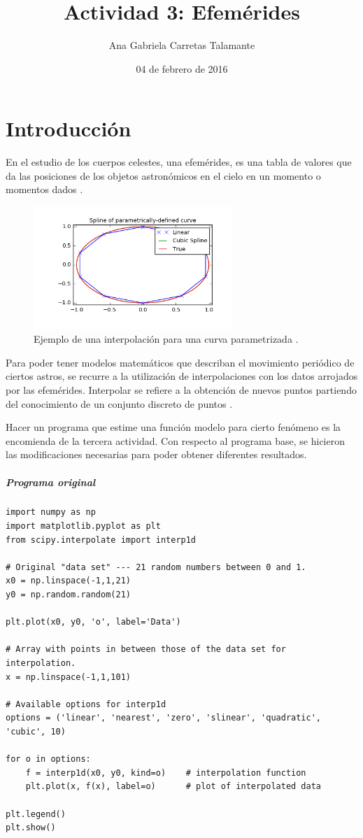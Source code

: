 \documentclass[12pt]{article}
\title{Actividad 3: Efemérides}
\author{Ana Gabriela Carretas Talamante}
\date{04 de febrero de 2016}
\begin{document}
\maketitle
\section{Introducción}
En el estudio de los cuerpos celestes, una efemérides, es una tabla de valores que da las posiciones de los objetos astronómicos en el cielo en un momento o momentos dados \cite{W}. 

\begin{figure}[H]
\centering
\includegraphics[width=7.5cm]{2}
\caption{Ejemplo de una interpolación para una curva parametrizada \cite{E}.}
\end{figure}

Para poder tener modelos matemáticos que describan el movimiento periódico de ciertos astros, se recurre a la utilización de interpolaciones con los datos arrojados por las efemérides. Interpolar se refiere a la obtención de nuevos puntos partiendo del conocimiento de un conjunto discreto de puntos \cite{I}. 

Hacer un programa que estime una función modelo para cierto fenómeno es la encomienda de la tercera actividad. Con respecto al programa base, se hicieron las modificaciones necesarias para poder obtener diferentes resultados.

\pagebreak

\subparagraph*{Programa original}
\begin{verbatim}
import numpy as np
import matplotlib.pyplot as plt
from scipy.interpolate import interp1d

# Original "data set" --- 21 random numbers between 0 and 1.
x0 = np.linspace(-1,1,21)
y0 = np.random.random(21)

plt.plot(x0, y0, 'o', label='Data')

# Array with points in between those of the data set for interpolation.
x = np.linspace(-1,1,101)

# Available options for interp1d
options = ('linear', 'nearest', 'zero', 'slinear', 'quadratic', 'cubic', 10)

for o in options:
    f = interp1d(x0, y0, kind=o)    # interpolation function
    plt.plot(x, f(x), label=o)      # plot of interpolated data

plt.legend()
plt.show()
\end{verbatim}
\end{document}
